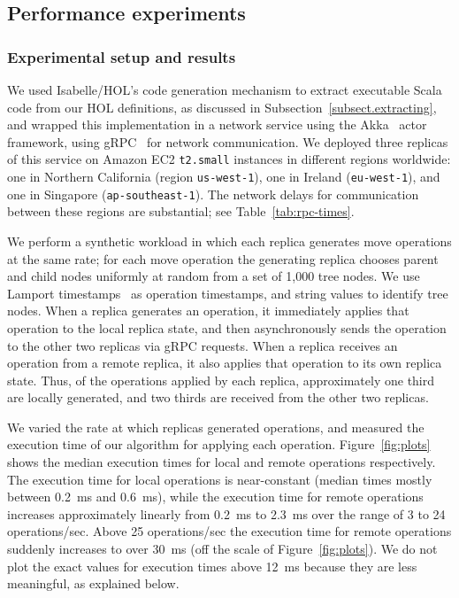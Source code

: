 \documentclass[sigconf]{acmart}
\begin{document}
\subsection{Performance experiments}

\subsubsection{Experimental setup and results}

We used Isabelle/HOL's code generation mechanism to extract executable Scala code from our HOL definitions, as discussed in Subsection~\ref{subsect.extracting}, and wrapped this implementation in a network service using the Akka~\cite{Akka} actor framework, using gRPC~\cite{gRPC} for network communication.
We deployed three replicas of this service on Amazon EC2 \texttt{t2.small} instances in different regions worldwide: one in Northern California (region \texttt{us-west-1}), one in Ireland (\texttt{eu-west-1}), and one in Singapore (\texttt{ap-southeast-1}).
The network delays for communication between these regions are substantial; see Table~\ref{tab:rpc-times}.

We perform a synthetic workload in which each replica generates move operations at the same rate; for each move operation the generating replica chooses parent and child nodes uniformly at random from a set of 1,000 tree nodes.
We use Lamport timestamps~\cite{Lamport:1978jq} as operation timestamps, and string values to identify tree nodes.
When a replica generates an operation, it immediately applies that operation to the local replica state, and then asynchronously sends the operation to the other two replicas via gRPC requests.
When a replica receives an operation from a remote replica, it also applies that operation to its own replica state.
Thus, of the operations applied by each replica, approximately one third are locally generated, and two thirds are received from the other two replicas.

We varied the rate at which replicas generated operations, and measured the execution time of our algorithm for applying each operation.
Figure~\ref{fig:plots} shows the median execution times for local and remote operations respectively.
The execution time for local operations is near-constant (median times mostly between 0.2~ms and 0.6~ms), while the execution time for remote operations increases approximately linearly from 0.2~ms to 2.3~ms over the range of 3 to 24 operations/sec.
Above 25 operations/sec the execution time for remote operations suddenly increases to over 30~ms (off the scale of Figure~\ref{fig:plots}).
We do not plot the exact values for execution times above 12~ms because they are less meaningful, as explained below.
\end{document}
